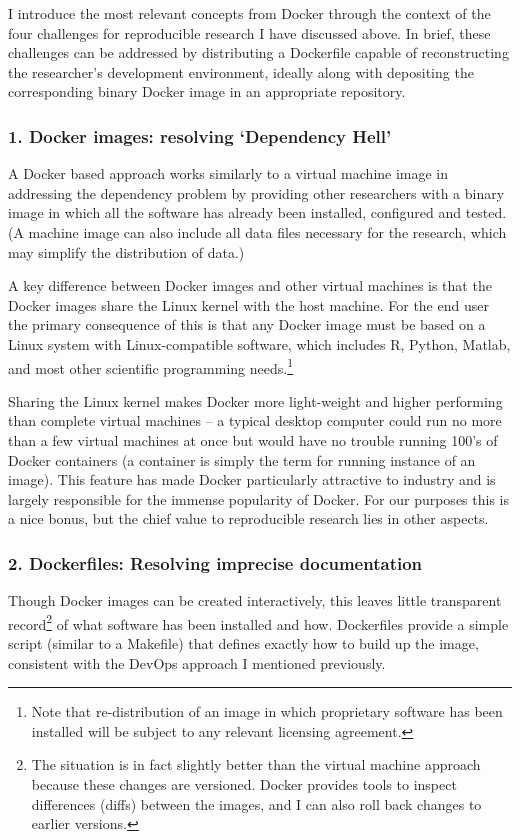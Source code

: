 \documentclass[9pt]{components/acm_proc_article-sp}
\begin{document}
I introduce the most relevant concepts from Docker through the context
of the four challenges for reproducible research I have discussed above.
In brief, these challenges can be addressed by distributing a Dockerfile
capable of reconstructing the researcher's development environment,
ideally along with depositing the corresponding binary Docker image in
an appropriate repository.

\subsubsection{1. Docker images: resolving `Dependency
Hell'}\label{docker-images-resolving-dependency-hell}

A Docker based approach works similarly to a virtual machine image in
addressing the dependency problem by providing other researchers with a
binary image in which all the software has already been installed,
configured and tested. (A machine image can also include all data files
necessary for the research, which may simplify the distribution of
data.)

A key difference between Docker images and other virtual machines is
that the Docker images share the Linux kernel with the host machine. For
the end user the primary consequence of this is that any Docker image
must be based on a Linux system with Linux-compatible software, which
includes R, Python, Matlab, and most other scientific programming
needs.\footnote{Note that re-distribution of an image in which
  proprietary software has been installed will be subject to any
  relevant licensing agreement.}

Sharing the Linux kernel makes Docker more light-weight and higher
performing than complete virtual machines -- a typical desktop computer
could run no more than a few virtual machines at once but would have no
trouble running 100's of Docker containers (a container is simply the
term for running instance of an image). This feature has made Docker
particularly attractive to industry and is largely responsible for the
immense popularity of Docker. For our purposes this is a nice bonus, but
the chief value to reproducible research lies in other aspects.

\subsubsection{2. Dockerfiles: Resolving imprecise
documentation}\label{dockerfiles-resolving-imprecise-documentation}

Though Docker images can be created interactively, this leaves little
transparent record\footnote{The situation is in fact slightly better
  than the virtual machine approach because these changes are versioned.
  Docker provides tools to inspect differences (diffs) between the
  images, and I can also roll back changes to earlier versions.} of what
software has been installed and how. Dockerfiles provide a simple script
(similar to a Makefile) that defines exactly how to build up the image,
consistent with the DevOps approach I mentioned previously.
\end{document}
